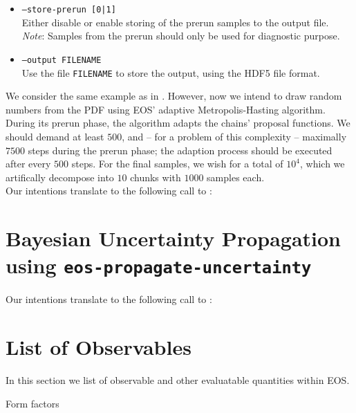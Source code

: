 \begin{itemize}
    \item[] \texttt{--store-prerun [0|1]}\\[\medskipamount]
        Either disable or enable storing of the prerun samples to the output file.\\

        \emph{Note}: Samples from the prerun should only be used for diagnostic purpose.

    \item[] \texttt{--output FILENAME}\\[\medskipamount]
        Use the file \texttt{FILENAME} to store the output, using the HDF5 file format.
\end{itemize}

We consider the same example as in . However, now we intend
to draw random numbers from the PDF using EOS' adaptive Metropolis-Hasting algorithm.
During its prerun phase, the algorithm adapts the chains' proposal
functions. We should demand at least $500$, and -- for a problem of this complexity -- maximally
$7500$ steps during the prerun phase; the adaption process should be executed
after every $500$ steps. For the final samples, we wish for a total of $10^4$, which we artifically decompose
into $10$ chunks with $1000$ samples each.\\

Our intentions translate to the following call to :


\section{Bayesian Uncertainty Propagation using \textbf{\texttt{eos-propagate-uncertainty}}}
\label{sec:usage:eos-propagate-uncertainty}

Our intentions translate to the following call to :

\section{List of Observables}
\label{sec:usage:observables}

In this section we list of observable and other evaluatable quantities within
EOS.

\begin{table}[h]
\begin{observables}
    \midrule
    \midrule
    \midrule
\end{observables}
\caption{Form factors}
\end{table}
